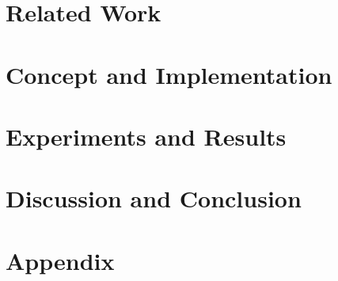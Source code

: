 \documentclass[en,]{template/rrlab}
\begin{document}
\chapter{Related Work} \label{related_work}
\chapter{Concept and Implementation} \label{concept_implementation}
\chapter{Experiments and Results} \label{experiments}
\chapter{Discussion and Conclusion} \label{discussion_conclusion}



\chapter{Appendix} \label{appendix}



\end{document}
